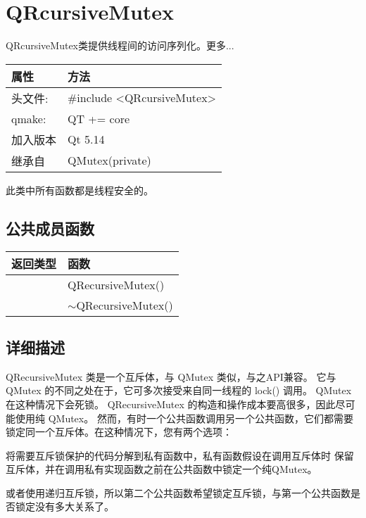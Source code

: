 \chapter{QRcursiveMutex}

QRcursiveMutex类提供线程间的访问序列化。更多...

\begin{tabular}{|l|l|}
\hline
属性 &	方法\\
\hline
头文件:& 	\#include <QRcursiveMutex>\\
\hline
qmake:& 	QT += core\\
\hline
加入版本 & 	Qt 5.14 \\ 
\hline
继承自 	& QMutex(private) \\ 
\hline
\end{tabular}

\begin{notice}
此类中所有函数都是线程安全的。
\end{notice}

\section{公共成员函数}

\begin{tabular}{|l|l|}
\hline
返回类型 &	函数 \\ 
\hline
& QRecursiveMutex() \\ 
\hline
& $\sim$QRecursiveMutex() \\ 
\hline
\end{tabular}

\section{详细描述}

QRecursiveMutex 类是一个互斥体，与 QMutex 类似，与之API兼容。
它与 QMutex 的不同之处在于，它可多次接受来自同一线程的 lock() 调用。
QMutex 在这种情况下会死锁。
QRecursiveMutex 的构造和操作成本要高很多，因此尽可能使用纯 QMutex。
然而，有时一个公共函数调用另一个公共函数，它们都需要锁定同一个互斥体。在这种情况下，您有两个选项：

\begin{compactitem}
\item 将需要互斥锁保护的代码分解到私有函数中，私有函数假设在调用互斥体时 保留互斥体，并在调用私有实现函数之前在公共函数中锁定一个纯QMutex。
\item 或者使用递归互斥锁，所以第二个公共函数希望锁定互斥锁，与第一个公共函数是否锁定没有多大关系了。
\end{compactitem}

